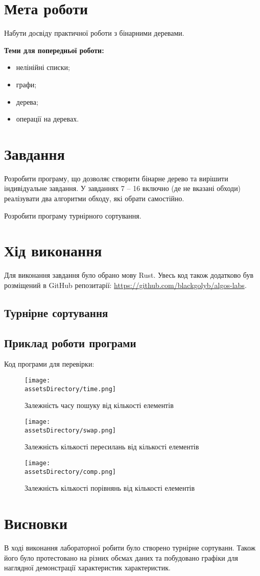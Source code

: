\section{Мета роботи}
Набути досвіду практичної роботи з бінарними деревами.

\noindent
\textbf{Теми для попередньої роботи:}
\begin{itemize}
    \item нелінійні списки;
    \item графи;
    \item дерева;
    \item операції на деревах.
\end{itemize}


\section{Завдання}
Розробити програму, що дозволяє створити бінарне дерево та
вирішити індивідуальне завдання. У завданнях 7 – 16 включно (де не вказані
обходи) реалізувати два алгоритми обходу, які обрати самостійно.

Розробити програму турнірного сортування.


\section{Хід виконання}
Для виконання завдання було обрано мову Rust.
Увесь код також додатково був розміщений в GitHub репозитарії: \href{https://github.com/blackgolyb/algos-labs}{https://github.com/blackgolyb/algos-labs}.


\newpage
\subsection{Турнірне сортування}



\newpage
\subsection{Приклад роботи програми}
\noindent
Код програми для перевірки:



\begin{figure}[ht!]
    \centering
    \texttt{[image: \\assetsDirectory/time.png]}
    \caption{Залежність часу пошуку від кількості елементів}
\end{figure}
\begin{figure}[ht!]
    \centering
    \texttt{[image: \\assetsDirectory/swap.png]}
    \caption{Залежність кількості пересилань від кількості елементів}
\end{figure}
\begin{figure}[ht!]
    \centering
    \texttt{[image: \\assetsDirectory/comp.png]}
    \caption{Залежність кількості порівнянь від кількості елементів}
\end{figure}


\newpage
\section{Висновки}
В ході виконання лабораторної робити було створено турнірне сортуванн.
Також його було протестовано на різних обємах даних та побудовано графіки для наглядної демонстрації характеристик характеристик.
